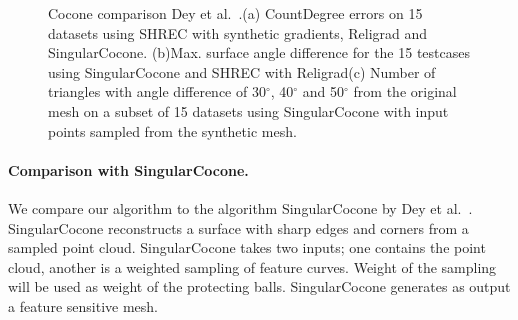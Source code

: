 \begin{figure}[t]
	\centering
		\caption{Cocone comparison Dey et al.~\cite{Dey2012,Dey2013}.(a) CountDegree errors on 15 datasets using SHREC with synthetic gradients, Religrad and SingularCocone. (b)Max. surface angle difference for the 15 testcases using SingularCocone and SHREC with Religrad(c) Number of triangles with angle difference of 30$^\circ$, 40$^\circ$ and 50$^\circ$ from the original mesh on a subset of 15 datasets using SingularCocone with  input points sampled from the synthetic mesh.}
		\label{fig:cocone:compare}
\end{figure}

\paragraph{Comparison with SingularCocone.}

We compare our algorithm to the algorithm SingularCocone by Dey et al.~\cite{Dey2012}. SingularCocone reconstructs a surface with sharp edges and corners from a sampled point cloud. SingularCocone takes two inputs; one contains the point cloud, another is a weighted sampling of feature curves. Weight of the sampling will be used as weight of the protecting balls. SingularCocone generates as output a feature sensitive mesh. 

